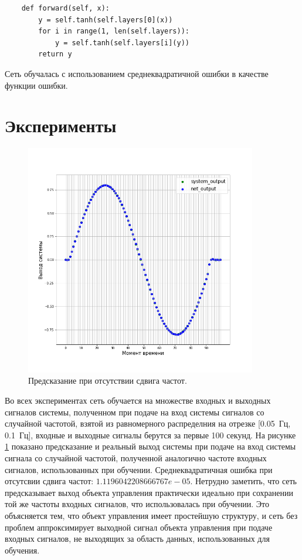 \documentclass[12pt, oneside]{extbook}
\begin{document}
\begin{flushleft}
\begin{verbatim}
    def forward(self, x):
        y = self.tanh(self.layers[0](x))
        for i in range(1, len(self.layers)):
            y = self.tanh(self.layers[i](y))
        return y
\end{verbatim}
\par
Сеть обучалась с использованием среднеквадратичной ошибки в качестве функции ошибки.
\pagebreak
\section{Эксперименты}
\begin{figure}[h]
\centering
\includegraphics[width=0.9\textwidth]{fcnet_prediction}
\caption{Предсказание при отсутствии сдвига частот.}
\label{fig:multi_prediction}
\end{figure}
Во всех экспериментах сеть обучается на множестве входных и выходных сигналов системы, полученном при подаче на вход системы сигналов со случайной частотой, взятой из равномерного распределния на отрезке [0.05~Гц, 0.1~Гц], входные и выходные сигналы берутся за первые 100 секунд. На рисунке \ref{fig:multi_prediction} показано предсказание и реальный выход системы при подаче на вход системы сигнала со случайной частотой, полученной аналогично частоте входных сигналов, использованных при обучении. Среднеквадратичная ошибка при отсутсвии сдвига частот: 
$ 1.1196042208666767e-05$. Нетрудно заметить, что сеть предсказывает выход объекта управления практически идеально при сохранении той же частоты входных сигналов, что использовалась при обучении. Это объясняется тем, что объект управления имеет простейшую структуру, и сеть без проблем аппроксимирует выходной сигнал объекта управления при подаче входных сигналов, не выходящих за область данных, использованных для обучения.

\end{flushleft}
\end{document}
